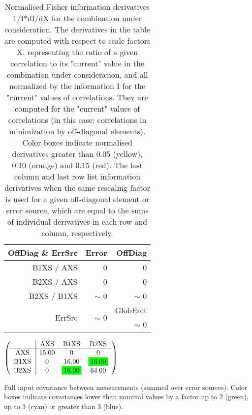 \begin{table}[H]
\scriptsize
\begin{center}
\renewcommand{\arraystretch}{1.1}
\begin{tabular}{|r|r|r|}
\hline
 OffDiag \& ErrSrc & {\tiny Error} & OffDiag\\
\hline
B1XS / AXS &  0 &  0 \\
B2XS / AXS &  0 &  0 \\
B2XS / B1XS &  {\tiny $\sim$ }0 &  {\tiny $\sim$ }0 \\
\hline
\multirow{2}{*}{ErrSrc} & \multirow{2}{*}{ {\tiny $\sim$ }0} & GlobFact\\
 & &  {\tiny $\sim$ }0 \\
\hline
\end{tabular}
\renewcommand{\arraystretch}{1}
\caption{Normalised Fisher information derivatives 1/I*dI/dX for the combination under consideration. The derivatives in the table are computed with respect to scale factors X, representing the ratio of a given correlation to its "current" value in the combination under consideration, and all normalized by the information I for the "current" values of correlations. They are computed for the "current" values of correlations (in this case: correlations in minimization by off-diagonal elements). Color boxes indicate normalised derivatives greater than 0.05 (yellow), 0.10 (orange) and 0.15 (red). The last column and last row list information derivatives when the same rescaling factor is used for a given off-diagonal element or error source, which are equal to the sums of individual derivatives in each row and column, respectively.}
\end{center}
\end{table}
\begin{table}[H]
\scriptsize
\begin{center}
\renewcommand{\arraystretch}{1.1}
\begin{math}\left(\begin{array}{c|ccc}
 & \mathrm{AXS} & 
\mathrm{B1XS} & 
\mathrm{B2XS} \\
\hline
\mathrm{AXS} \hspace*{2pt} &      15.00 &  0 &  0 \\
\mathrm{B1XS} \hspace*{2pt} &  0 &      16.00 &  \colorbox{Green1}{$     16.00$} \\
\mathrm{B2XS} \hspace*{2pt} &  0 &  \colorbox{Green1}{$     16.00$} &      64.00 \\
\end{array}\right)\end{math}
\caption{Full input covariance between measurements (summed over error sources). Color boxes indicate covariances lower than nominal values by a factor up to 2 (green), up to 3 (cyan) or greater than 3 (blue).}
\renewcommand{\arraystretch}{1}
\end{center}
\end{table}
